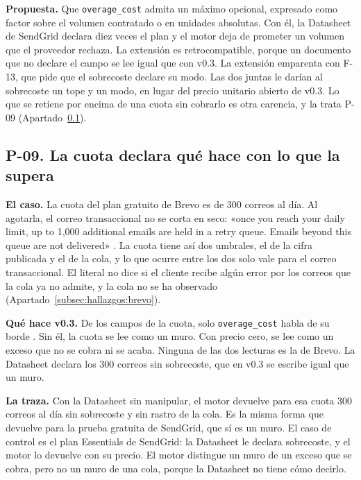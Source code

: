 \textbf{Propuesta.} Que \texttt{overage\_cost} admita un máximo opcional, expresado como factor sobre el volumen contratado o en unidades absolutas.
Con él, la Datasheet de SendGrid declara diez veces el plan y el motor deja de prometer un volumen que el proveedor rechaza.
La extensión es retrocompatible, porque un documento que no declare el campo se lee igual que con v0.3.
La extensión emparenta con F-13, que pide que el sobrecoste declare su modo.
Las dos juntas le darían al sobrecoste un tope y un modo, en lugar del precio unitario abierto de v0.3.
Lo que se retiene por encima de una cuota sin cobrarlo es otra carencia, y la trata P-09 (Apartado~\ref{subsec:evolucion:p09}).

\subsection{P-09. La cuota declara qué hace con lo que la supera}
\label{subsec:evolucion:p09}

\textbf{El caso.} La cuota del plan gratuito de Brevo es de 300 correos al día.
Al agotarla, el correo transaccional no se corta en seco: «once you reach your daily limit, up to 1,000 additional emails are held in a retry queue. Emails beyond this queue are not delivered» \citep{brevohelpfree}.
La cuota tiene así dos umbrales, el de la cifra publicada y el de la cola, y lo que ocurre entre los dos solo vale para el correo transaccional.
El literal no dice si el cliente recibe algún error por los correos que la cola ya no admite, y la cola no se ha observado (Apartado~\ref{subsec:hallazgos:brevo}).

\textbf{Qué hace v0.3.} De los campos de la cuota, solo \texttt{overage\_cost} habla de su borde \citep{apisconsumptionmodel}.
Sin él, la cuota se lee como un muro.
Con precio cero, se lee como un exceso que no se cobra ni se acaba.
Ninguna de las dos lecturas es la de Brevo.
La Datasheet declara los 300 correos sin sobrecoste, que en v0.3 se escribe igual que un muro.

\textbf{La traza.} Con la Datasheet sin manipular, el motor devuelve para esa cuota 300 correos al día sin sobrecoste y sin rastro de la cola.
Es la misma forma que devuelve para la prueba gratuita de SendGrid, que sí es un muro.
El caso de control es el plan Essentials de SendGrid: la Datasheet le declara sobrecoste, y el motor lo devuelve con su precio.
El motor distingue un muro de un exceso que se cobra, pero no un muro de una cola, porque la Datasheet no tiene cómo decirlo.

